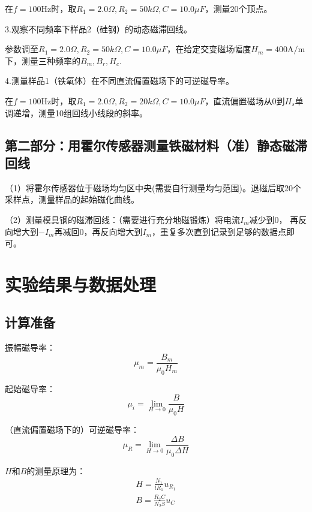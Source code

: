 \documentclass[11pt]{article}
\begin{document}
	在$f=100\text{Hz}$时，取$R_1=2.0\Omega,R_2=50k\Omega,C=10.0\mu F$，测量20个顶点。
	
	
	\medskip
	3.观察不同频率下样品2（硅钢）的动态磁滞回线。
	
	参数调至$R_1=2.0\Omega,R_2=50k\Omega,C=10.0\mu F$，在给定交变磁场幅度$H_m=400\text{A}/\text{m}$下，测量三种频率的$B_m,B_r,H_c$.
	
	
	
	\medskip
	4.测量样品1（铁氧体）在不同直流偏置磁场下的可逆磁导率。
	
	在$f=100\text{Hz}$时，取$R_1=2.0\Omega,R_2=20k\Omega,C=10.0\mu F$，直流偏置磁场从$0$到$H_s$单调递增，测量10组回线小线段的斜率。
	
	
	
	
	\subsection{第二部分：用霍尔传感器测量铁磁材料（准）静态磁滞回线}
	
	（1）将霍尔传感器位于磁场均匀区中央(需要自行测量均匀范围)。退磁后取20个采样点，测量样品的起始磁化曲线。
	
	（2）测量模具钢的磁滞回线：（需要进行充分地磁锻炼）将电流$I_m$减少到0，
	再反向增大到$-I_m$再减回0，再反向增大到$I_m$，重复多次直到记录到足够的数据点即可。
	
	
	
	
	\section{实验结果与数据处理}
	
	\subsection{计算准备}
	振幅磁导率：
	\begin{equation*}
		\mu_m = \frac{B_m}{\mu_0H_m}
	\end{equation*}
	
	起始磁导率：
	\begin{equation*}
		\mu_i = \lim_{H\rightarrow 0}\frac{B}{\mu_{0}H}
	\end{equation*}
	
	（直流偏置磁场下的）可逆磁导率：
	\begin{equation*}
		\mu_R = \lim_{H\rightarrow 0}\frac{\Delta B}{\mu_{0}\Delta H}
	\end{equation*}
	
	$H$和$B$的测量原理为：
	\begin{gather*}
		H = \frac{N_1}{l R_1}u_{R_1}\\
		B = \frac{R_2 C}{N_2 S}u_C
	\end{gather*}
	
\end{document}
